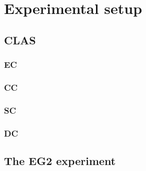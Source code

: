 \chapter{Experimental setup}

\section{CLAS}

\subsection{EC}

\subsection{CC}

\subsection{SC}

\subsection{DC}

\section{The EG2 experiment}